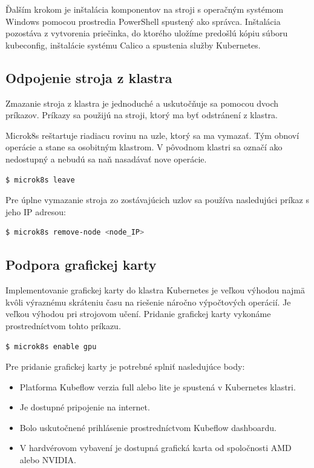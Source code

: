 Ďalším krokom je inštalácia komponentov na stroji s operačným systémom Windows pomocou prostredia PowerShell spustený ako správca. Inštalácia pozostáva z vytvorenia priečinka, do ktorého uložíme predošlú kópiu súboru kubeconfig, inštalácie systému Calico a spustenia služby Kubernetes.

\subsection{Odpojenie stroja z klastra}

Zmazanie stroja z klastra je jednoduché a uskutočňuje sa pomocou dvoch príkazov. Príkazy sa použijú na stroji, ktorý ma byť odstránení z klastra.

Microk8s reštartuje riadiacu rovinu na uzle, ktorý sa ma vymazať. Tým obnoví operácie a stane sa osobitným klastrom. V pôvodnom klastri sa označí ako nedostupný a nebudú sa naň nasadávať nove operácie.
\begin{lstlisting}[language=Bash]
    $ microk8s leave
    \end{lstlisting}
Pre úplne vymazanie stroja zo zostávajúcich uzlov sa používa nasledujúci príkaz s jeho IP adresou:
\begin{lstlisting}[language=Bash]
    $ microk8s remove-node <node_IP>
    \end{lstlisting}
\subsection{Podpora grafickej karty}

Implementovanie grafickej karty do klastra Kubernetes je veľkou výhodou najmä kvôli výraznému skráteniu času na riešenie náročno výpočtových operácií. Je veľkou výhodou pri strojovom učení. Pridanie grafickej karty vykonáme prostredníctvom tohto príkazu.

\begin{lstlisting}[language=Bash]
    $ microk8s enable gpu
    \end{lstlisting}

Pre pridanie grafickej karty je potrebné splniť nasledujúce body:

\begin{itemize}
    \item Platforma Kubeflow verzia full alebo lite je spustená v Kubernetes klastri.
    \item Je dostupné pripojenie na internet.
    \item Bolo uskutočnené prihlásenie prostredníctvom Kubeflow dashboardu.
    \item V hardvérovom vybavení je dostupná grafická karta od spoločnosti AMD alebo NVIDIA.
\end{itemize}

